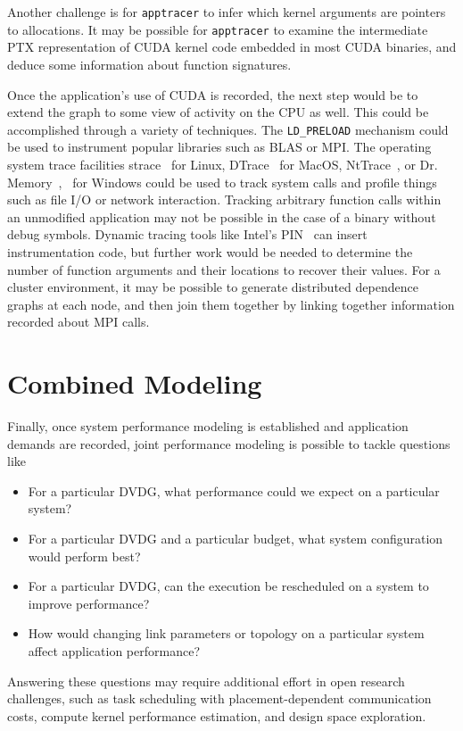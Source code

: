 Another challenge is for \texttt{apptracer} to infer which kernel arguments are pointers to allocations.
It may be possible for \texttt{apptracer} to examine the intermediate PTX representation of CUDA kernel code embedded in most CUDA binaries, and deduce some information about function signatures.

Once the application's use of CUDA is recorded, the next step would be to extend the graph to some view of activity on the CPU as well.
This could be accomplished through a variety of techniques.
The \texttt{LD\_PRELOAD} mechanism could be used to instrument popular libraries such as BLAS or MPI.
The operating system trace facilities strace~\cite{strace2018} for Linux, DTrace~\cite{dtrace2008} for MacOS, NtTrace~\cite{orr2014nttrace}, or Dr. Memory~\cite{bruening2001design},~\cite{drmemory2018} for Windows could be used to track system calls and profile things such as file I/O or network interaction.
Tracking arbitrary function calls within an unmodified application may not be possible in the case of a binary without debug symbols.
Dynamic tracing tools like Intel's PIN~\cite{intel2012pin} can insert instrumentation code, but further work would be needed to determine the number of function arguments and their locations to recover their values.
For a cluster environment, it may be possible to generate distributed dependence graphs at each node, and then join them together by linking together information recorded about MPI calls.

\section{Combined Modeling}
\label{sec:modeling}

Finally, once system performance modeling is established and application demands are recorded, joint performance modeling is possible to tackle questions like
\begin{itemize}
    \item For a particular DVDG, what performance could we expect on a particular system?
    \item For a particular DVDG and a particular budget, what system configuration would perform best?
    \item For a particular DVDG, can the execution be rescheduled on a system to improve performance?
    \item How would changing link parameters or topology on a particular system affect application performance?
\end{itemize}
Answering these questions may require additional effort in open research challenges, such as task scheduling with placement-dependent communication costs, compute kernel performance estimation, and design space exploration.
